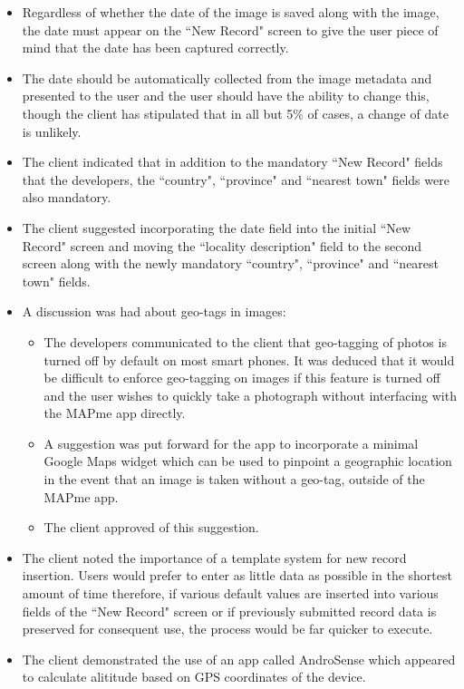 \documentclass[12pt,a4paper,oneside]{report}
\begin{document}
\begin{itemize}
	\item Regardless of whether the date of the image is saved along with the image, the date must appear on the ``New Record" screen to give the user piece of mind that the date has been captured correctly.
	\item The date should be automatically collected from the image metadata and presented to the user and the user should have the ability to change this, though the client has stipulated that in all but 5\% of cases, a change of date is unlikely.
	\item The client indicated that in addition to the mandatory ``New Record" fields that the developers, the ``country", ``province" and ``nearest town" fields were also mandatory.
	\item The client suggested incorporating the date field into the initial ``New Record" screen and moving the ``locality description" field to the second screen along with the newly mandatory ``country", ``province" and ``nearest town" fields.
	\item A discussion was had about geo-tags in images:
	\begin{itemize}
		\item The developers communicated to the client that geo-tagging of photos is turned off by default on most smart phones.  It was deduced that it would be difficult to enforce geo-tagging on images if this feature is turned off and the user wishes to quickly take a photograph without interfacing with the MAPme app directly.
		\item  A suggestion was put forward for the app to incorporate a minimal Google Maps widget which can be used to pinpoint a geographic location in the event that an image is taken without a geo-tag, outside of the MAPme app.
		\item The client approved of this suggestion.
	\end{itemize}
	\item The client noted the importance of a template system for new record insertion.  Users would prefer to enter as little data as possible in the shortest amount of time therefore, if various default values are inserted into various fields of the ``New Record" screen or if previously submitted record data is preserved for consequent use, the process would be far quicker to execute.
	\item The client demonstrated the use of an app called AndroSense which appeared to calculate alititude based on GPS coordinates of the device.
	\end{itemize}
\end{document}
